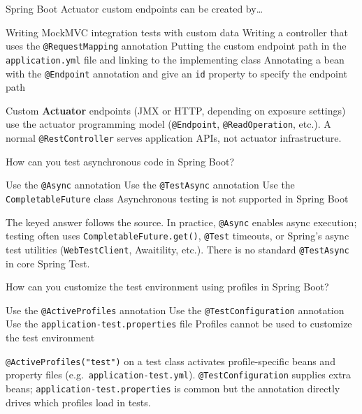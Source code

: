 \question[4]
Spring Boot Actuator custom endpoints can be created by\ldots
\begin{choices}
  \choice Writing MockMVC integration tests with custom data
  \choice Writing a controller that uses the \texttt{@RequestMapping} annotation
  \choice Putting the custom endpoint path in the \texttt{application.yml} file and linking to the implementing class
  \CorrectChoice Annotating a bean with the \texttt{@Endpoint} annotation and give an \texttt{id} property to specify the endpoint path
\end{choices}
\begin{solution}
  Custom \textbf{Actuator} endpoints (JMX or HTTP, depending on exposure settings) use the actuator programming model (\texttt{@Endpoint}, \texttt{@ReadOperation}, etc.). A normal \texttt{@RestController} serves application APIs, not actuator infrastructure.
\end{solution}

\question[4]
How can you test asynchronous code in Spring Boot?
\begin{choices}
  \choice Use the \texttt{@Async} annotation
  \choice Use the \texttt{@TestAsync} annotation
  \CorrectChoice Use the \texttt{CompletableFuture} class
  \choice Asynchronous testing is not supported in Spring Boot
\end{choices}
\begin{solution}
  The keyed answer follows the source. In practice, \texttt{@Async} enables async execution; testing often uses \texttt{CompletableFuture.get()}, \texttt{@Test} timeouts, or Spring's async test utilities (\texttt{WebTestClient}, Awaitility, etc.). There is no standard \texttt{@TestAsync} in core Spring Test.
\end{solution}

\question[4]
How can you customize the test environment using profiles in Spring Boot?
\begin{choices}
  \CorrectChoice Use the \texttt{@ActiveProfiles} annotation
  \choice Use the \texttt{@TestConfiguration} annotation
  \choice Use the \texttt{application-test.properties} file
  \choice Profiles cannot be used to customize the test environment
\end{choices}
\begin{solution}
  \texttt{@ActiveProfiles("test")} on a test class activates profile-specific beans and property files (e.g.\ \texttt{application-test.yml}). \texttt{@TestConfiguration} supplies extra beans; \texttt{application-test.properties} is common but the annotation directly drives which profiles load in tests.
\end{solution}

